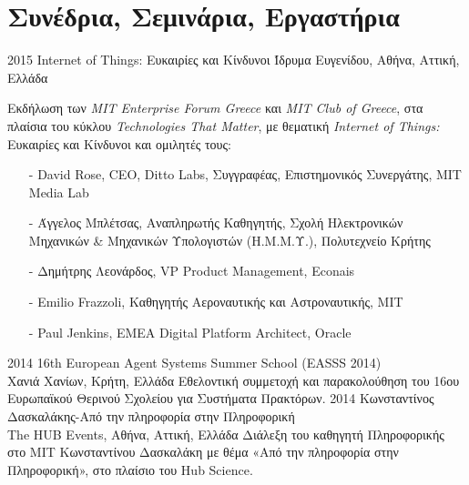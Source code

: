 \documentclass[print]{keros-cv} %
\begin{document}
\newpage

\section{Συνέδρια, Σεμινάρια, Εργαστήρια}
\begin{entrylist}
\entry
{2015}
{Internet of Things: Ευκαιρίες και Κίνδυνοι}
{Ίδρυμα Ευγενίδου, Αθήνα, Αττική, Ελλάδα}
{Εκδήλωση των \emph{MIT Enterprise Forum Greece} και \emph{MIT Club of Greece}, στα πλαίσια του κύκλου \emph{Technologies That Matter}, με θεματική \emph{Internet of Things:} Ευκαιρίες και Κίνδυνοι και ομιλητές τους:
\begin{itemize}
\item[-] David Rose, CEO, Ditto Labs, Συγγραφέας, Επιστημονικός Συνεργάτης, MIT Media Lab
\item[-] Άγγελος Μπλέτσας, Αναπληρωτής Καθηγητής, Σχολή Ηλεκτρονικών Μηχανικών \& Μηχανικών Υπολογιστών (Η.Μ.Μ.Υ.), Πολυτεχνείο Κρήτης
\item[-] Δημήτρης Λεονάρδος, VP Product Management, Econais
\item[-] Emilio Frazzoli, Καθηγητής Αεροναυτικής και Αστροναυτικής, MIT
\item[-] Paul Jenkins, EMEA Digital Platform Architect, Oracle
\end{itemize}
}
\entry
{2014}
{16th European Agent Systems Summer School (EASSS 2014)\\}
{Χανιά Χανίων, Κρήτη, Ελλάδα}
{Εθελοντική συμμετοχή και παρακολούθηση του 16ου Ευρωπαϊκού Θερινού Σχολείου για Συστήματα Πρακτόρων.}
\entry
{2014}
{Κωνσταντίνος Δασκαλάκης-Από την πληροφορία στην Πληροφορική\\}
{The HUB Events, Αθήνα, Αττική, Ελλάδα}
{Διάλεξη του καθηγητή Πληροφορικής στο MIT Κωνσταντίνου Δασκαλάκη με θέμα «Από την πληροφορία στην Πληροφορική», στο πλαίσιο του Hub Science.}
\end{entrylist}

\end{document}
